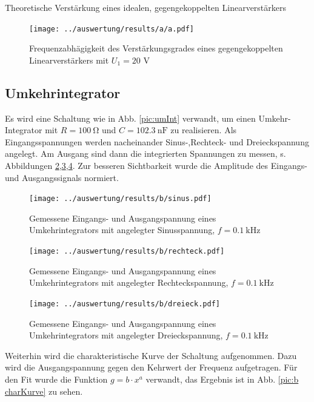 \begin{table}
	\centering
	
	\caption{Theoretische Verstärkung eines idealen, gegengekoppelten Linearverstärkers}
	\label{table:a_theorie}
\end{table}

\begin{figure}
	\centering
	\texttt{[image: ../auswertung/results/a/a.pdf]}
	\caption{Frequenzabhägigkeit des Verstärkungsgrades eines gegengekoppelten Linearverstärkers mit $U_1 = 20$ V}
	\label{pic:a plot}
\end{figure}

\subsection{Umkehrintegrator}
Es wird eine Schaltung wie in Abb. \ref{pic:umInt} verwandt, um einen Umkehr-Integrator mit $R = 100\ \si{\ohm}$ und $C = 102.3\ \si{\nano\farad}$ zu realisieren. Als Eingangsspannungen werden nacheinander Sinus-,Rechteck- und Dreieckspannung angelegt. Am Ausgang sind dann die integrierten Spannungen zu messen, s. Abbildungen \ref{pic:b sinus},\ref{pic:b rechteck},\ref{pic:b dreieck}. Zur besseren Sichtbarkeit wurde die Amplitude des Eingangs- und Ausgangssignals normiert.

\begin{figure}
	\centering
	\texttt{[image: ../auswertung/results/b/sinus.pdf]}
	\caption{Gemessene Eingangs- und Ausgangspannung eines Umkehrintegrators mit angelegter Sinusspannung, $f = 0.1\ \si{\kilo\hertz}$}
	\label{pic:b sinus}
\end{figure}

\begin{figure}
	\centering
	\texttt{[image: ../auswertung/results/b/rechteck.pdf]}
	\caption{Gemessene Eingangs- und Ausgangspannung eines Umkehrintegrators mit angelegter Rechteckspannung, $f = 0.1\ \si{\kilo\hertz}$}
	\label{pic:b rechteck}
\end{figure}

\begin{figure}
	\centering
	\texttt{[image: ../auswertung/results/b/dreieck.pdf]}
	\caption{Gemessene Eingangs- und Ausgangspannung eines Umkehrintegrators mit angelegter Dreieckspannung, $f = 0.1\ \si{\kilo\hertz}$}
	\label{pic:b dreieck}
\end{figure}

Weiterhin wird die charakteristische Kurve der Schaltung aufgenommen. Dazu wird die Ausgangspannung gegen den Kehrwert der Frequenz aufgetragen. Für den Fit wurde die Funktion $g = b \cdot x^a$ verwandt, das Ergebnis ist in Abb. \ref{pic:b charKurve} zu sehen.

